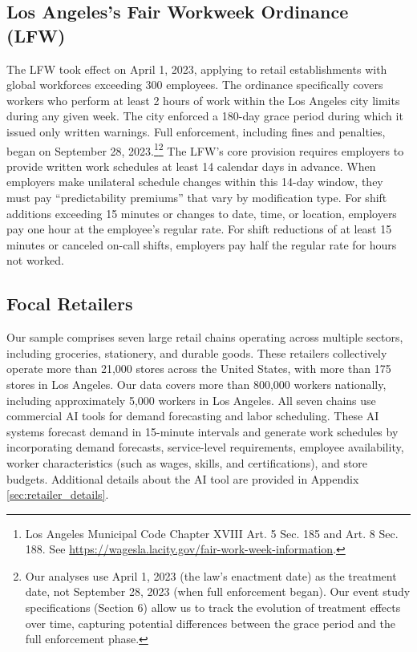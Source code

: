 \documentclass[letterpaper,11pt,leqno]{article}
\theoremstyle{paper}
\begin{document}
\subsection{Los Angeles's Fair Workweek Ordinance (LFW)} \label{subsec:losangeles_fw_intro}
The LFW took effect on April 1, 2023, applying to retail establishments with global workforces exceeding 300 employees. The ordinance specifically covers workers who perform at least 2 hours of work within the Los Angeles city limits during any given week. The city enforced a 180-day grace period during which it issued only written warnings. Full enforcement, including fines and penalties, began on September 28, 2023.\footnote{Los Angeles Municipal Code Chapter XVIII Art. 5 Sec. 185 and Art. 8 Sec. 188. See \url{https://wagesla.lacity.gov/fair-work-week-information}.}\footnote{Our analyses use April 1, 2023 (the law's enactment date) as the treatment date, not September 28, 2023 (when full enforcement began). Our event study specifications (Section 6) allow us to track the evolution of treatment effects over time, capturing potential differences between the grace period and the full enforcement phase.} The LFW's core provision requires employers to provide written work schedules at least 14 calendar days in advance. When employers make unilateral schedule changes within this 14-day window, they must pay ``predictability premiums'' that vary by modification type. For shift additions exceeding 15 minutes or changes to date, time, or location, employers pay one hour at the employee's regular rate. For shift reductions of at least 15 minutes or canceled on-call shifts, employers pay half the regular rate for hours not worked. 


\subsection{Focal Retailers} \label{subsec:focal_retailers}
Our sample comprises seven large retail chains operating across multiple sectors, including groceries, stationery, and durable goods. These retailers collectively operate more than 21,000 stores across the United States, with more than 175 stores in Los Angeles. Our data covers more than 800,000 workers nationally, including approximately 5,000 workers in Los Angeles. All seven chains use commercial AI tools for demand forecasting and labor scheduling. These AI systems forecast demand in 15-minute intervals and generate work schedules by incorporating demand forecasts, service-level requirements, employee availability, worker characteristics (such as wages, skills, and certifications), and store budgets. Additional details about the AI tool are provided in Appendix \ref{sec:retailer_details}. 
\end{document}
